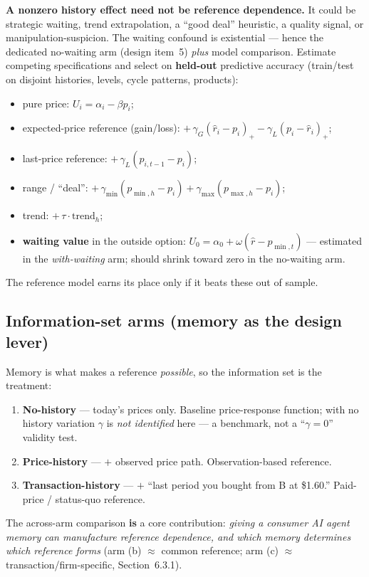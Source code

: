 \documentclass[11pt]{article}
\newcommand{\crit}[1]{\textcolor{crit}{\textbf{#1}}}
\newcommand{\med}[1]{\textcolor{med}{#1}}
\begin{document}
\crit{A nonzero history effect need not be reference dependence.} It could be strategic waiting, trend
extrapolation, a ``good deal'' heuristic, a quality signal, or manipulation-suspicion. \med{The waiting
confound is existential} --- hence the dedicated no-waiting arm (design item~5) \emph{plus} model
comparison. Estimate competing specifications and select on \textbf{held-out} predictive accuracy
(train/test on disjoint histories, levels, cycle patterns, products):
\begin{itemize}\setlength\itemsep{1pt}
  \item pure price: $U_i=\alpha_i-\beta p_i$;
  \item expected-price reference (gain/loss): $+\,\gamma_G(\hat r_i-p_i)_+-\gamma_L(p_i-\hat r_i)_+$;
  \item last-price reference: $+\,\gamma_L(p_{i,t-1}-p_i)$;
  \item range / ``deal'': $+\,\gamma_{\min}(p_{\min,h}-p_i)+\gamma_{\max}(p_{\max,h}-p_i)$;
  \item trend: $+\,\tau\cdot\text{trend}_h$;
  \item \textbf{waiting value} in the outside option: $U_0=\alpha_0+\omega(\hat r-p_{\min,t})$ ---
        estimated in the \emph{with-waiting} arm; should shrink toward zero in the no-waiting arm.
\end{itemize}
The reference model earns its place only if it beats these out of sample.

\subsection*{Information-set arms (memory as the design lever)}

Memory is what makes a reference \emph{possible}, so the information set is the treatment:
\begin{enumerate}[label=(\alph*)]
  \item \textbf{No-history} --- today's prices only. \med{Baseline price-response function; with no history
        variation $\gamma$ is \emph{not identified} here --- a benchmark, not a ``$\gamma=0$'' validity
        test.}
  \item \textbf{Price-history} --- $+$ observed price path. Observation-based reference.
  \item \textbf{Transaction-history} --- $+$ ``last period you bought from B at \$1.60.'' Paid-price /
        status-quo reference.
\end{enumerate}
The across-arm comparison \crit{is} a core contribution: \emph{giving a consumer AI agent memory can
manufacture reference dependence, and which memory determines which reference forms} (arm (b) $\approx$
common reference; arm (c) $\approx$ transaction/firm-specific, Section~6.3.1).
\end{document}
